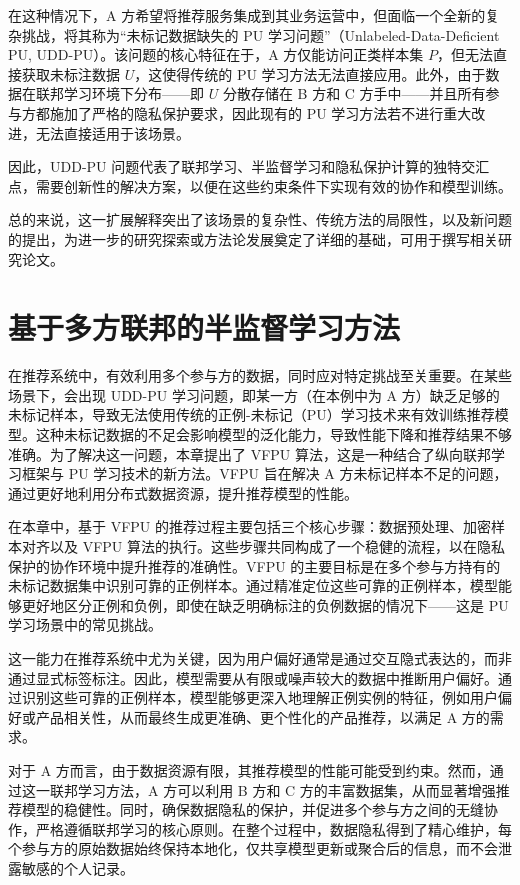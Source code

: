 在这种情况下，A 方希望将推荐服务集成到其业务运营中，但面临一个全新的复杂挑战，将其称为“未标记数据缺失的 PU 学习问题”（Unlabeled-Data-Deficient PU, UDD-PU）。该问题的核心特征在于，A 方仅能访问正类样本集 $ P $，但无法直接获取未标注数据 $ U $，这使得传统的 PU 学习方法无法直接应用。此外，由于数据在联邦学习环境下分布——即 $ U $ 分散存储在 B 方和 C 方手中——并且所有参与方都施加了严格的隐私保护要求，因此现有的 PU 学习方法若不进行重大改进，无法直接适用于该场景。

因此，UDD-PU 问题代表了联邦学习、半监督学习和隐私保护计算的独特交汇点，需要创新性的解决方案，以便在这些约束条件下实现有效的协作和模型训练。

总的来说，这一扩展解释突出了该场景的复杂性、传统方法的局限性，以及新问题的提出，为进一步的研究探索或方法论发展奠定了详细的基础，可用于撰写相关研究论文。


\section{基于多方联邦的半监督学习方法}
在推荐系统中，有效利用多个参与方的数据，同时应对特定挑战至关重要。在某些场景下，会出现 UDD-PU 学习问题，即某一方（在本例中为 A 方）缺乏足够的未标记样本，导致无法使用传统的正例-未标记（PU）学习技术来有效训练推荐模型。这种未标记数据的不足会影响模型的泛化能力，导致性能下降和推荐结果不够准确。为了解决这一问题，本章提出了 VFPU 算法，这是一种结合了纵向联邦学习框架与 PU 学习技术的新方法。VFPU 旨在解决 A 方未标记样本不足的问题，通过更好地利用分布式数据资源，提升推荐模型的性能。

在本章中，基于 VFPU 的推荐过程主要包括三个核心步骤：数据预处理、加密样本对齐以及 VFPU 算法的执行。这些步骤共同构成了一个稳健的流程，以在隐私保护的协作环境中提升推荐的准确性。VFPU 的主要目标是在多个参与方持有的未标记数据集中识别可靠的正例样本。通过精准定位这些可靠的正例样本，模型能够更好地区分正例和负例，即使在缺乏明确标注的负例数据的情况下——这是 PU 学习场景中的常见挑战。

这一能力在推荐系统中尤为关键，因为用户偏好通常是通过交互隐式表达的，而非通过显式标签标注。因此，模型需要从有限或噪声较大的数据中推断用户偏好。通过识别这些可靠的正例样本，模型能够更深入地理解正例实例的特征，例如用户偏好或产品相关性，从而最终生成更准确、更个性化的产品推荐，以满足 A 方的需求。

对于 A 方而言，由于数据资源有限，其推荐模型的性能可能受到约束。然而，通过这一联邦学习方法，A 方可以利用 B 方和 C 方的丰富数据集，从而显著增强推荐模型的稳健性。同时，确保数据隐私的保护，并促进多个参与方之间的无缝协作，严格遵循联邦学习的核心原则。在整个过程中，数据隐私得到了精心维护，每个参与方的原始数据始终保持本地化，仅共享模型更新或聚合后的信息，而不会泄露敏感的个人记录。

